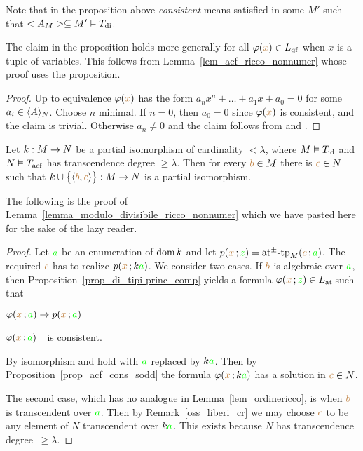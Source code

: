 \documentclass[creche.tex]{subfiles}
\begin{document}
Note that in the proposition above \textit{consistent\/} means satisfied in some $M'$ such that $<A_M>\subseteq M'\models T_{\rm di}$.

The claim in the proposition holds more generally for all $\phi({\mr x})\in L_{\rm qf}$ when $x$ is a tuple of variables. This follows from Lemma~\ref{lem_acf_ricco_nonnumer} whose proof uses the proposition.

\begin{proof}
Up to equivalence $\phi({\mr x})$ has the form $a_nx^n + \dots + a_1 x + a_0=0$ for some $a_i\in\<A\>_N$. Choose $n$ minimal. If $n=0$, then $a_0=0$ since $\phi({\mr x})$ is consistent, and the claim is trivial. Otherwise $a_n\neq0$ and the claim follows from  and . 
\end{proof}

\begin{lemma}\label{lem_acf_ricco_nonnumer}
Let $k:M\imp N$ be a partial isomorphism of cardinality $<\lambda$, where $M\models T_{\rm id}$ and $N\models T_{\rm acf}$ has transcendence degree $\ge\lambda$. Then for every ${\mr b}\in M$ there is ${\mr c}\in N$ such that $k\cup\big\{\<{\mr b},{\mr c}\>\big\}:M\imp N$ is a partial isomorphism.
\end{lemma}

The following is the proof of Lemma~\ref{lemma_modulo_divisibile_ricco_nonnumer} which we have pasted here for the sake of the lazy reader.

\begin{proof}
Let ${\gr a}$ be an enumeration of $\dom k$ and let $p({\mr x}\,;{\gr z})=\atpmtp_M({\mr c}\,;{\gr a})$. The required ${\mr c}$ has to realize $p({\mr x}\,;k{\gr a})$. We consider two cases. If ${\mr b}$ is algebraic over ${\gr a}$, then Proposition~\ref{prop_di_tipi princ_comp} yields a formula $\phi({\mr x}\,;{\gr z})\in\atL$ such that 

\noindent{}\hspace{5ex} $\phi({\mr x}\,;{\gr a})\imp p({\mr x}\,;{\gr a})$

\noindent{}\hspace{5ex} $\phi({\mr x}\,;{\gr a})$\ \ is consistent.

By isomorphism  and  hold with ${\gr a}$ replaced by $k{\gr a}$. Then by Proposition~\ref{prop_acf_cons_sodd} the formula $\phi({\mr x}\,;k{\gr a})$ has a solution in ${\mr c}\in N$.

The second case, which has no analogue in Lemma~\ref{lem_ordinericco}, is when ${\mr b}$ is transcendent over ${\gr a}$. Then by  Remark~\ref{oss_liberi_cr} we may choose ${\mr c}$ to be any element of $N$ transcendent over $k{\gr a}$. This exists because $N$ has transcendence degree $\ \ge\lambda$. 
\end{proof}
\end{document}
